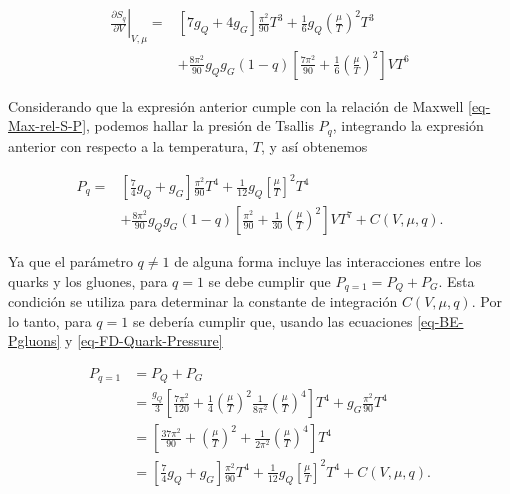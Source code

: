 \begin{equation}
\begin{split}
\left. \frac{\partial{S}_{q}}{\partial V} \right|_{V,\mu}  =  & \left[ 7{g}_{Q} + 4 {g}_{G}\right] \frac{{\pi}^{2}}{90} {T}^{3} + \frac{1}{6} {g}_{Q} \left(\frac{\mu}{T} \right)^{2} {T}^{3}\\
& + \frac{8{\pi}^{2}}{90} {g}_{Q}{g}_{G} (1-q) \left[ \frac{7{\pi}^{2}}{90} + \frac{1}{6} \left(\frac{\mu}{T} \right)^{2} \right]V{T}^{6}
\end{split}
\end{equation}

Considerando que la expresión anterior cumple con la relación de Maxwell \eqref{eq-Max-rel-S-P}, podemos hallar la presión de Tsallis ${P}_{q}$, integrando la expresión anterior con respecto a la temperatura, $T$, y así obtenemos

\begin{equation}\label{eq-Tsallis-Pressure}
\begin{split}
{P}_{q} = & \left[\frac{7}{4} {g}_{Q} + {g}_{G} \right] \frac{{\pi}^{2}}{90} {T}^{4} + \frac{1}{12}{g}_{Q} \left[\frac{\mu}{T}\right]^{2}{T}^{4}\\
& + \frac{8{\pi}^{2}}{90} {g}_{Q}{g}_{G}(1-q) \left[\frac{{\pi}^{2}}{90} + \frac{1}{30} \left( \frac{\mu}{T}\right)^{2}\right]V{T}^{7} + C(V,\mu,q).
\end{split}
\end{equation}

Ya que el parámetro $q \neq 1$ de alguna forma incluye las interacciones entre los quarks y los gluones, para $q=1$ se debe cumplir que ${P}_{q=1} = {P}_{Q} + {P}_{G}$. Esta condición se utiliza para determinar la constante de integración $C(V,\mu,q)$. Por lo tanto, para $q = 1$ se debería cumplir que, usando las ecuaciones \eqref{eq-BE-Pgluons} y \eqref{eq-FD-Quark-Pressure}

\begin{equation}\label{eq-Tsallis-Pressure-Const}
\begin{split}
{P}_{q=1} & = {P}_{Q} + {P}_{G}\\
& = \frac{{g}_{Q}}{3} \left[\frac{7 {\pi}^{2}}{120} + \frac{1}{4} \left(\frac{\mu}{T} \right)^{2} \frac{1}{8{\pi}^{2}} \left(\frac{\mu}{T} \right)^{4} \right] {T}^{4} + {g}_{G} \frac{{\pi}^{2}}{90}{T}^{4} \\
& = \left[\frac{37{\pi}^{2}}{90} + \left(\frac{\mu}{T} \right)^{2} + \frac{1}{2{\pi}^{2}}\left( \frac{\mu}{T}\right)^{4} \right]{T}^{4} \\
& = \left[\frac{7}{4} {g}_{Q} + {g}_{G} \right] \frac{{\pi}^{2}}{90} {T}^{4} + \frac{1}{12}{g}_{Q} \left[\frac{\mu}{T}\right]^{2}{T}^{4} + C(V,\mu,q).
\end{split}
\end{equation}

